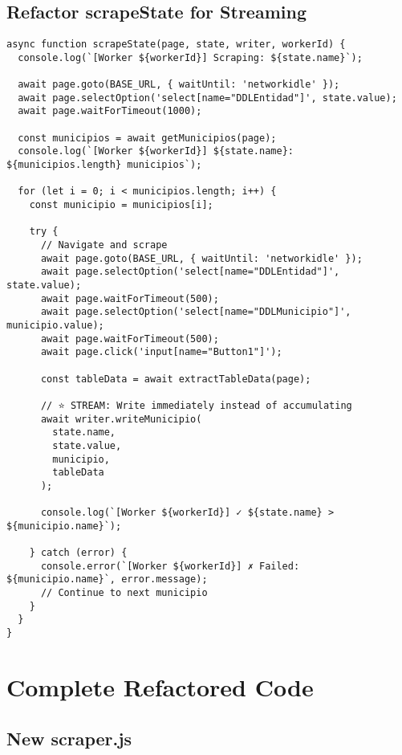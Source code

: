 \documentclass[11pt,a4paper]{article}
\begin{document}
\subsection{Refactor scrapeState for Streaming}

\begin{lstlisting}[caption={Stream-Enabled scrapeState Function}]
async function scrapeState(page, state, writer, workerId) {
  console.log(`[Worker ${workerId}] Scraping: ${state.name}`);

  await page.goto(BASE_URL, { waitUntil: 'networkidle' });
  await page.selectOption('select[name="DDLEntidad"]', state.value);
  await page.waitForTimeout(1000);

  const municipios = await getMunicipios(page);
  console.log(`[Worker ${workerId}] ${state.name}: ${municipios.length} municipios`);

  for (let i = 0; i < municipios.length; i++) {
    const municipio = municipios[i];

    try {
      // Navigate and scrape
      await page.goto(BASE_URL, { waitUntil: 'networkidle' });
      await page.selectOption('select[name="DDLEntidad"]', state.value);
      await page.waitForTimeout(500);
      await page.selectOption('select[name="DDLMunicipio"]', municipio.value);
      await page.waitForTimeout(500);
      await page.click('input[name="Button1"]');

      const tableData = await extractTableData(page);

      // ⭐ STREAM: Write immediately instead of accumulating
      await writer.writeMunicipio(
        state.name,
        state.value,
        municipio,
        tableData
      );

      console.log(`[Worker ${workerId}] ✓ ${state.name} > ${municipio.name}`);

    } catch (error) {
      console.error(`[Worker ${workerId}] ✗ Failed: ${municipio.name}`, error.message);
      // Continue to next municipio
    }
  }
}
\end{lstlisting}

\section{Complete Refactored Code}

\subsection{New scraper.js}
\end{document}

